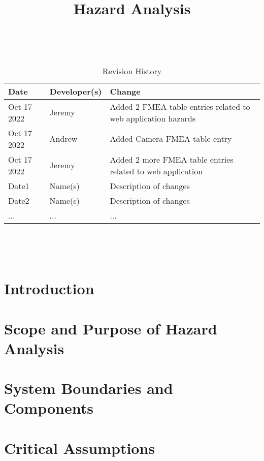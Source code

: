 \documentclass{article}
\title{Hazard Analysis\\\progname}
\author{\authname}
\date{}
\begin{document}
\maketitle
\thispagestyle{empty}

~\newpage


\begin{table}[hp]
\caption{Revision History} \label{TblRevisionHistory}
\begin{tabularx}{\textwidth}{llX}
\toprule
\textbf{Date} & \textbf{Developer(s)} & \textbf{Change}\\
\midrule
Oct 17 2022 & Jeremy & Added 2 FMEA table entries related to web application hazards\\
Oct 17 2022 & Andrew & Added Camera FMEA table entry\\
Oct 17 2022 & Jeremy & Added 2 more FMEA table entries related to web application\\
Date1 & Name(s) & Description of changes\\
Date2 & Name(s) & Description of changes\\
... & ... & ...\\
\bottomrule
\end{tabularx}
\end{table}

~\newpage

\tableofcontents

~\newpage



\section{Introduction}


\section{Scope and Purpose of Hazard Analysis}

\section{System Boundaries and Components}

\section{Critical Assumptions}
\end{document}
